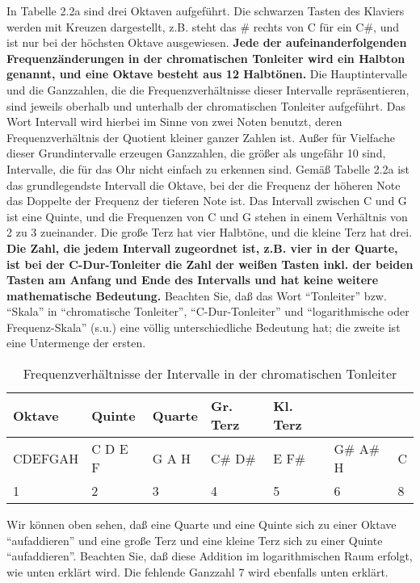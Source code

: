 In Tabelle 2.2a sind drei Oktaven aufgeführt.
Die schwarzen Tasten des Klaviers werden mit Kreuzen dargestellt, z.B. steht das \# rechts von C für ein C\#, und ist nur bei der höchsten Oktave ausgewiesen.
\textbf{Jede der aufeinanderfolgenden Frequenzänderungen in der chromatischen Tonleiter wird ein Halbton genannt, und eine Oktave besteht aus 12 Halbtönen.}
Die Hauptintervalle und die Ganzzahlen, die die Frequenzverhältnisse dieser Intervalle repräsentieren, sind jeweils oberhalb und unterhalb der chromatischen Tonleiter aufgeführt.
Das Wort Intervall wird hierbei im Sinne von zwei Noten benutzt, deren Frequenzverhältnis der Quotient kleiner ganzer Zahlen ist.
Außer für Vielfache dieser Grundintervalle erzeugen Ganzzahlen, die größer als ungefähr 10 sind, Intervalle, die für das Ohr nicht einfach zu erkennen sind.
Gemäß Tabelle 2.2a ist das grundlegendste Intervall die Oktave, bei der die Frequenz der höheren Note das Doppelte der Frequenz der tieferen Note ist.
Das Intervall zwischen C und G ist eine Quinte, und die Frequenzen von C und G stehen in einem Verhältnis von 2 zu 3 zueinander.
Die große Terz hat vier Halbtöne, und die kleine Terz hat drei.
\textbf{Die Zahl, die jedem Intervall zugeordnet ist, z.B. vier in der Quarte, ist bei der C-Dur-Tonleiter die Zahl der weißen Tasten inkl. der beiden Tasten am Anfang und Ende des Intervalls und hat keine weitere mathematische Bedeutung.}
Beachten Sie, daß das Wort \enquote{Tonleiter} bzw. \enquote{Skala} in \enquote{chromatische Tonleiter}, \enquote{C-Dur-Tonleiter} und \enquote{logarithmische oder Frequenz-Skala} (s.u.) eine völlig unterschiedliche Bedeutung hat; die zweite ist eine Untermenge der ersten.

\begin{table}
 \begin{tabular}{l|l|l|l|l|l|l}
  \textbf{Oktave} & \textbf{Quinte} & \textbf{Quarte} & \textbf{Gr. Terz} & \textbf{Kl. Terz} & & \\ 
  \hline
  CDEFGAH & C D E F & G A H & C\# D\# & E F\# & G\# A\# H & C \\
  1 & 2 & 3 & 4 & 5 & 6 & 8 \\
  \end{tabular}
 \caption{Frequenzverhältnisse der Intervalle in der chromatischen Tonleiter}
\end{table}

Wir können oben sehen, daß eine Quarte und eine Quinte sich zu einer Oktave \enquote{aufaddieren} und eine große Terz und eine kleine Terz sich zu einer Quinte \enquote{aufaddieren}.
Beachten Sie, daß diese Addition im logarithmischen Raum erfolgt, wie unten erklärt wird.
Die fehlende Ganzzahl 7 wird ebenfalls unten erklärt.
 


